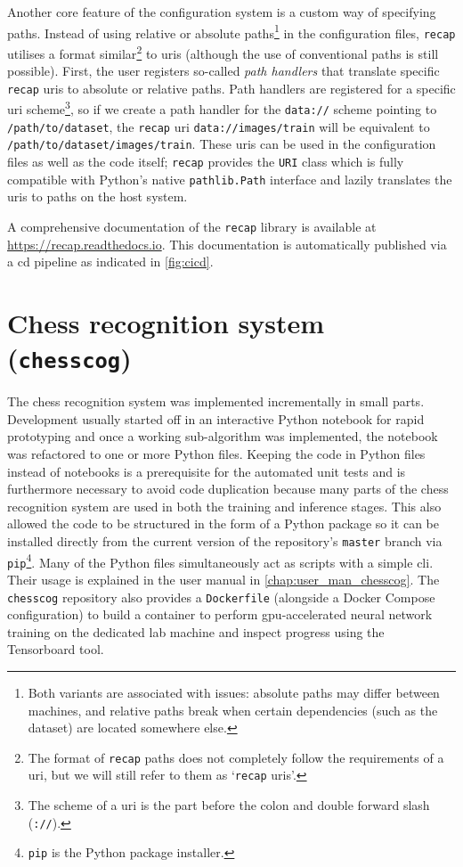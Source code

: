 \documentclass[../report.tex]{subfiles}
\begin{document}
Another core feature of the configuration system is a custom way of specifying paths.
Instead of using relative or absolute paths\footnote{Both variants are associated with issues: absolute paths may differ between machines, and relative paths break when certain dependencies (such as the dataset) are located somewhere else.} in the configuration files, \texttt{recap} utilises a format similar\footnote{The format of \texttt{recap} paths does not completely follow the requirements of a \gls{uri}, but we will still refer to them as `\texttt{recap} \glspl{uri}'.} to \glspl{uri} (although the use of conventional paths is still possible).
First, the user registers so-called \emph{path handlers} that translate specific \texttt{recap} \glspl{uri} to absolute or relative paths.
Path handlers are registered for a specific \gls{uri} scheme\footnote{The scheme of a \gls{uri} is the part before the colon and double forward slash (\texttt{://}).}, so if we create a path handler for the \texttt{data://} scheme pointing to \texttt{/path/to/dataset}, the \texttt{recap} \gls{uri} \texttt{data://images/train} will be equivalent to \texttt{/path/to/dataset/images/train}.
These \glspl{uri} can be used in the configuration files as well as the code itself; 
\texttt{recap} provides the \texttt{URI} class which is fully compatible with Python's native \texttt{pathlib.Path} interface and lazily translates the \glspl{uri} to paths on the host system.

A comprehensive documentation of the \texttt{recap} library is available at \url{https://recap.readthedocs.io}.
This documentation is automatically published via a \gls{cd} pipeline as indicated in \cref{fig:cicd}.

\section{Chess recognition system (\texttt{chesscog})}
The chess recognition system was implemented incrementally in small parts. 
Development usually started off in an interactive Python notebook for rapid prototyping and once a working sub-algorithm was implemented, the notebook was refactored to one or more Python files.
Keeping the code in Python files instead of notebooks is a prerequisite for the automated unit tests and is furthermore necessary to avoid code duplication because many parts of the chess recognition system are used in both the training and inference stages.
This also allowed the code to be structured in the form of a Python package so it can be installed directly from the current version of the repository's \texttt{master} branch via \texttt{pip}\footnote{\texttt{pip} is the Python package installer.}.
Many of the Python files simultaneously act as scripts with a simple \gls{cli}.
Their usage is explained in the user manual in \cref{chap:user_man_chesscog}.
The \texttt{chesscog} repository also provides a \texttt{Dockerfile} (alongside a Docker Compose configuration) to build a container to perform \gls{gpu}-accelerated neural network training on the dedicated lab machine and inspect progress using the Tensorboard tool.
\end{document}
